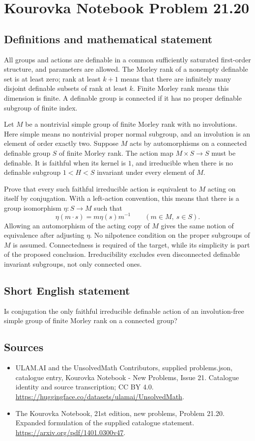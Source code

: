 \documentclass[11pt,a4paper]{article}
\begin{document}
\section*{Kourovka Notebook Problem 21.20}\label{statement}

\subsection{Definitions and mathematical statement}
All groups and actions are definable in a common sufficiently saturated
first-order structure, and parameters are allowed. The Morley rank of
a nonempty definable set is at least zero; rank at least $k+1$ means
that there are infinitely many disjoint definable subsets of rank at
least $k$. Finite Morley rank means this dimension is finite.
A definable group is connected if it has no proper definable subgroup
of finite index.

Let $M$ be a nontrivial simple group of finite Morley rank with no
involutions. Here simple means no nontrivial proper normal subgroup,
and an involution is an element of order exactly two. Suppose $M$
acts by automorphisms on a connected definable group $S$ of finite
Morley rank. The action map $M\times S\to S$ must be definable.
It is faithful when its kernel is $1$, and irreducible when there is
no definable subgroup $1<H<S$ invariant under every element of $M$.

Prove that every such faithful irreducible action is equivalent to
$M$ acting on itself by conjugation. With a left-action convention,
this means that there is a group isomorphism $\eta:S\to M$ such that
\[
 \eta(m\cdot s)=m\eta(s)m^{-1}
                    \qquad(m\in M,\ s\in S).
\]
Allowing an automorphism of the acting copy of $M$ gives the same
notion of equivalence after adjusting $\eta$.
No nilpotence condition on the proper subgroups of $M$ is assumed.
Connectedness is required of the target, while its simplicity is part
of the proposed conclusion. Irreducibility excludes even disconnected
definable invariant subgroups, not only connected ones.
\subsection{Short English statement}
Is conjugation the only faithful irreducible definable action of an involution-free simple group of finite Morley rank on a connected group?
\subsection{Sources}
\begin{itemize}
\item[S1] ULAM.AI and the UnsolvedMath Contributors, supplied problems.json, catalogue entry, Kourovka Notebook - New Problems, Issue 21. Catalogue identity and source transcription; CC BY 4.0.
\url{https://huggingface.co/datasets/ulamai/UnsolvedMath}.
\item[S2] The Kourovka Notebook, 21st edition, new problems, Problem 21.20. Expanded formulation of the supplied catalogue statement.
\url{https://arxiv.org/pdf/1401.0300v47}.
\end{itemize}
\end{document}
